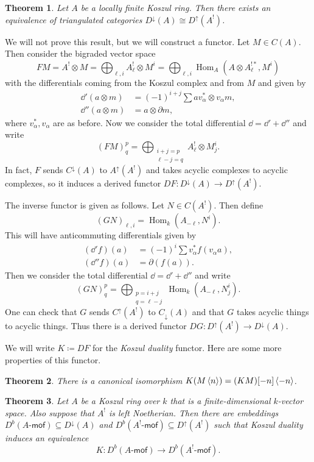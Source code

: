 \documentclass{amsart}
\newtheorem{thm}{Theorem}[section]
\theoremstyle{definition}
\theoremstyle{remark}
\theoremstyle{plain}
\theoremstyle{definition}
\theoremstyle{remark}
\newcommand{\ms}[1]{\mathsf{#1}}
\DeclareMathOperator{\Hom}{Hom}
\begin{document}
\begin{thm}
    Let $A$ be a locally finite Koszul ring. Then there exists an equivalence of triangulated categories $D^{\downarrow}(A) \cong D^{\uparrow}(A^!)$.
\end{thm}

We will not prove this result, but we will construct a functor. Let $M \in C(A)$. Then consider the bigraded vector space
\[ FM = A^! \otimes M = \bigoplus_{\ell,i} A_{\ell}^! \otimes M^i = \bigoplus_{\ell,i} \Hom_A(A \otimes A_{\ell}^{!*}, M^i) \]
with the differentials coming from the Koszul complex and from $M$ and given by
\begin{align*}
    \dd'(a \otimes m) &= (-1)^{i+j} \sum a v_{\alpha}^* \otimes v_{\alpha} m, \\
    \dd''(a \otimes m) &= a \otimes \partial m,
\end{align*}
where $v_{\alpha}^*, v_{\alpha}$ are as before. Now we consider the total differential $\dd = \dd' + \dd''$ and write
\[ (FM)_q^p = \bigoplus_{\substack{i+j=p \\ \ell-j = q}} A_{\ell}^! \otimes M_j^i. \]
In fact, $F$ sends $C^{\downarrow}(A)$ to $A^{\uparrow}(A^!)$ and takes acyclic complexes to acyclic complexes, so it induces a derived functor $DF \colon D^{\downarrow}(A) \to D^{\uparrow}(A^!)$. 

The inverse functor is given as follows. Let $N \in C(A^!)$. Then define
\[ (GN)_{\ell,i} = \Hom_k(A_{-\ell}, N^i). \]
This will have anticommuting differentials given by
\begin{align*}
    (\dd' f)(a) &= (-1)^i \sum v_{\alpha}^* f(v_{\alpha} a), \\
    (\dd'' f)(a) &= \partial(f(a)).
\end{align*}
Then we consider the total differential $\dd = \dd' + \dd''$ and write
\[ (GN)_q^p = \bigoplus_{\substack{p=i+j\\ q=\ell-j}} \Hom_k(A_{-\ell}, N_j^i). \]
One can check that $G$ sends $C^{\uparrow}(A^!)$ to $C_{\downarrow}(A)$ and that $G$ takes acyclic things to acyclic things. Thus there is a derived functor $DG \colon D^{\uparrow}(A^!) \to D^{\downarrow}(A)$.

We will write $K \coloneqq DF$ for the \textit{Koszul duality} functor. Here are some more properties of this functor.
\begin{thm}
    There is a canonical isomorphism $K(M\ev{n}) = (KM)[-n]\ev{-n}$.
\end{thm}

\begin{thm}
    Let $A$ be a Koszul ring over $k$ that is a finite-dimensional $k$-vector space. Also suppose that $A^!$ is left Noetherian. Then there are embeddings $D^b(A\text{-}\ms{mof}) \subseteq D^{\downarrow}(A)$ and $D^b(A^!\text{-}\ms{mof}) \subseteq D^{\uparrow}(A^!)$ such that Koszul duality induces an equivalence
    \[ K \colon D^b(A\text{-}\ms{mof}) \to D^b(A^!\text{-}\ms{mof}). \]
\end{thm}
\end{document}
